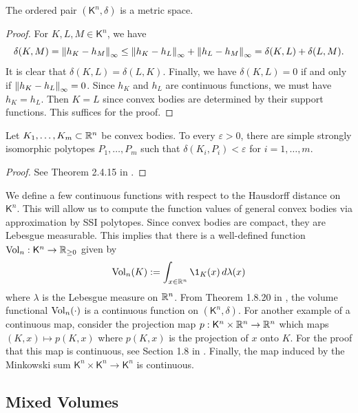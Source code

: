 \documentclass{puthesis-UG}
\begin{document}
\begin{prop} \label{convex-body-is-metric-space}
	The ordered pair $(\mathsf{K}^n, \delta)$ is a metric space. 
\end{prop}

\begin{proof}
	For $K, L, M \in \mathsf{K}^n$, we have 
	\[
		\delta(K, M) = \left\lVert h_K - h_M\right\rVert_\infty \leq \left\lVert h_K - h_L\right\rVert_\infty + \left\lVert h_L - h_M\right\rVert_\infty = \delta(K, L) + \delta(L, M). 
	\]
	It is clear that $\delta (K, L) = \delta (L, K)$. Finally, we have $\delta(K, L) = 0$ if and only if $\left\lVert h_K - h_L\right\rVert_\infty = 0$. Since $h_K$ and $h_L$ are continuous functions, we must have $h_K = h_L$. Then $K = L$ since convex bodies are determined by their support functions. This suffices for the proof. 
\end{proof}

\begin{thm} \label{approximation-SSI}
	Let $K_1, \ldots, K_m \subset \mathbb{R}^n$ be convex bodies. To every $\varepsilon > 0$, there are simple strongly isomorphic polytopes $P_1, \ldots, P_m$ such that $\delta (K_i, P_i) < \varepsilon$ for $i = 1, \ldots, m$.
\end{thm}

\begin{proof}
	See Theorem 2.4.15 in \cite{schneider_2013}. 
\end{proof}

We define a few continuous functions with respect to the Hausdorff distance on $\mathsf{K}^n$. This will allow us to compute the function values of general convex bodies via approximation by SSI polytopes. Since convex bodies are compact, they are Lebesgue measurable. This implies that there is a well-defined function $\operatorname{Vol}_n : \mathsf{K}^n \to \mathbb{R}_{\geq 0}$ given by
\[
	\Vol_n (K) := \int_{x \in \RR^n} \1_K(x) \, d \lambda(x)
\]
where $\lambda$ is the Lebesgue measure on $\mathbb{R}^n$. From Theorem 1.8.20 in \cite{schneider_2013}, the volume functional $\operatorname{Vol}_n(\cdot)$ is a continuous function on $(\mathsf{K}^n, \delta)$. For another example of a continuous map, consider the projection map $p : \mathsf{K}^n \times \mathbb{R}^n \to \mathbb{R}^n$ which maps $(K, x) \mapsto p(K, x)$ where $p(K, x)$ is the projection of $x$ onto $K$. For the proof that this map is continuous, see Section 1.8 in \cite{schneider_2013}. Finally, the map induced by the Minkowski sum $\mathsf{K}^n \times \mathsf{K}^n \to \mathsf{K}^n$ is continuous. 


\subsection{Mixed Volumes}
\end{document}
